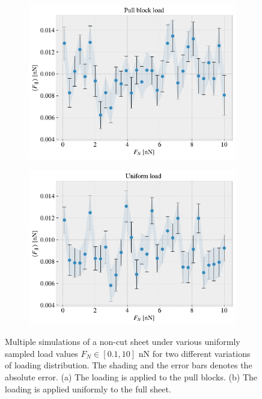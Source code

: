\begin{figure}[H]
  \centering
  \begin{subfigure}[t]{0.49\textwidth}
      \centering
      \includegraphics[width=\textwidth]{figures/baseline/load_dist_a.pdf}
      \caption{}
      \label{fig:load_dist_a}
  \end{subfigure}
  \hfill
  \begin{subfigure}[t]{0.49\textwidth}
      \centering
      \includegraphics[width=\textwidth]{figures/baseline/load_dist_b.pdf}
      \caption{}
      \label{fig:load_dist_b}
  \end{subfigure}
  \hfill
     \caption{Multiple simulations of a non-cut sheet under various uniformly sampled load values $F_N \in [0.1, 10]$ nN for two different variations of loading distribution. The shading and the error bars denotes the absolute error. (a) The loading is applied to the pull blocks. (b) The loading is applied uniformly to the full sheet. }
     \label{fig:load_dist}
\end{figure}

